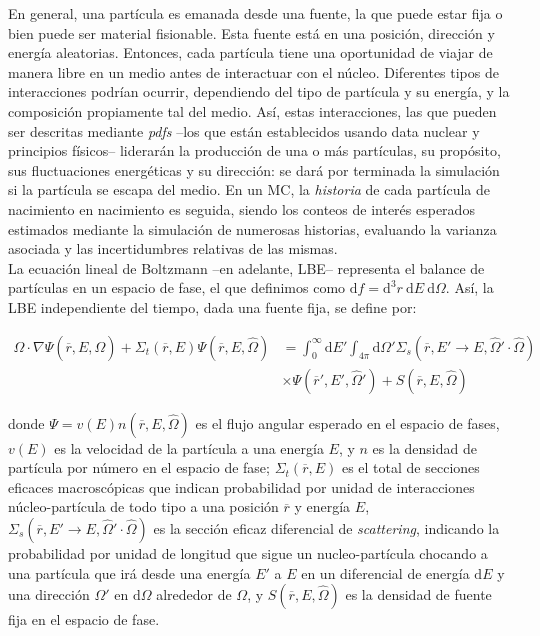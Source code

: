 En general, una partícula es emanada desde una fuente, la que puede estar fija o bien puede ser material fisionable. Esta fuente está en una posición, dirección y energía aleatorias. Entonces, cada partícula tiene una oportunidad de viajar de manera libre en un medio antes de interactuar con el núcleo. Diferentes tipos de interacciones podrían ocurrir, dependiendo del tipo de partícula y su energía, y la composición propiamente tal del medio. Así, estas interacciones, las que pueden ser descritas mediante \emph{pdfs} --los que están establecidos usando data nuclear y principios físicos-- liderarán la producción de una o más partículas, su propósito, sus fluctuaciones energéticas y su dirección: se dará por terminada la simulación si la partícula se escapa del medio. En un MC, la \emph{historia} de cada partícula de nacimiento en nacimiento es seguida, siendo los conteos de interés esperados estimados mediante la simulación de numerosas historias, evaluando la varianza asociada y las incertidumbres relativas de las mismas. \\

La ecuación lineal de Boltzmann --en adelante, LBE-- representa el balance de partículas en un espacio de fase, el que definimos como $\text{d}f = \text{d}^3r \ \text{d}E \ \text{d}\Omega$. Así, la LBE independiente del tiempo, dada una fuente fija, se define por:

\begin{equation}
\label{1}
\begin{split}
\hat{\Omega} \cdot \nabla\Psi\left(\overline{r}, E, \hat{\Omega}\right) + \Sigma_{t}\left(\overline{r}, E\right)\Psi\left(\overline{r}, E, \hat{\Omega}\right) & = \int_{0}^{\infty} \text{d}E' \int_{4\pi} \text{d}\Omega' \Sigma_{s}\left(\overline{r}, E' \rightarrow E, \hat{\Omega}' \cdot \hat{\Omega}\right) \\
& \times \Psi\left(\overline{r}', E', \hat{\Omega}'\right) + S\left(\overline{r}, E, \hat{\Omega}\right)
\end{split}
\end{equation}

donde $\Psi = v\left(E\right) n\left(\overline{r}, E, \hat{\Omega}\right)$ es el flujo angular esperado en el espacio de fases, $v\left(E\right)$ es la velocidad de la partícula a una energía $E$, y $n$ es la densidad de partícula por número en el espacio de fase; $\Sigma_{t}\left(\overline{r}, E\right)$ es el total de secciones eficaces macroscópicas que indican probabilidad por unidad de interacciones núcleo-partícula de todo tipo a una posición $\overline{r}$ y energía $E$, $\Sigma_{s}\left(\overline{r}, E' \rightarrow E, \hat{\Omega}' \cdot \hat{\Omega} \right)$ es la sección eficaz diferencial de \emph{scattering}, indicando la probabilidad por unidad de longitud que sigue un nucleo-partícula chocando a una partícula que irá desde una energía $E'$ a $E$ en un diferencial de energía $\text{d}E$ y una dirección $\Omega'$ en $\text{d}\Omega$ alrededor de $\Omega$, y $S\left(\overline{r}, E, \hat{\Omega}\right)$ es la densidad de fuente fija en el espacio de fase. \\

